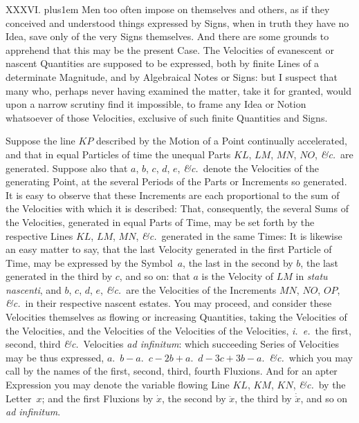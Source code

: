 \medbreak

XXXVI. \hskip 0pt plus1em
Men too often impose on themselves and others, as if they
conceived and understood things expressed by Signs, when in truth
they have no Idea, save only of the very Signs themselves.  And
there are some grounds to apprehend that this may be the present
Case.  The Velocities of evanescent or nascent Quantities are
supposed to be expressed, both by finite Lines of a determinate
Magnitude, and by Algebraical Notes or Signs: but I suspect that
many who, perhaps never having examined the matter, take it for
granted, would upon a narrow scrutiny find it impossible, to
frame any Idea or Notion whatsoever of those Velocities,
exclusive of such finite Quantities and Signs.

\midinsert
\centerline{}
\endinsert

\noindent
Suppose the line
$KP$ described by the Motion of a Point continually accelerated,
and that in equal Particles of time the unequal Parts $KL$, $LM$,
$MN$, $NO$, {\it \&c.}\ are generated.  Suppose also that $a$,
$b$, $c$, $d$, $e$, {\it \&c.}\ denote the Velocities of the
generating Point, at the several Periods of the Parts or
Increments so generated.  It is easy to observe that these
Increments are each proportional to the sum of the Velocities
with which it is described: That, consequently, the several Sums
of the Velocities, generated in equal Parts of Time, may be set
forth by the respective Lines $KL$, $LM$, $MN$,
{\it \&c.}\ generated in the same Times: It is likewise an easy
matter to say, that the last Velocity generated in the first
Particle of Time, may be expressed by the Symbol~$a$, the last in
the second by $b$, the last generated in the third by $c$, and so
on: that $a$ is the Velocity of $LM$ in {\it statu nascenti}, and
$b$, $c$, $d$, $e$, {\it \&c.}\ are the Velocities of the
Increments $MN$, $NO$, $OP$, {\it \&c.}\ in their respective
nascent estates.  You may proceed, and consider these Velocities
themselves as flowing or increasing Quantities, taking the
Velocities of the Velocities, and the Velocities of the
Velocities of the Velocities, {\it i.~e.}\ the first, second,
third {\it \&c.}\ Velocities {\it ad infinitum\/}: which
succeeding Series of Velocities may be thus expressed,
$a$.\ $b - a$.\ $c - 2b + a$.\ $d - 3c + 3b - a$.\ {\it \&c.}\
which you may call by the names of the first, second, third,
fourth Fluxions.  And for an apter Expression you may denote the
variable flowing Line $KL$, $KM$, $KN$, {\it \&c.}\ by the
Letter~$x$; and the first Fluxions by $\dot{x}$, the second by
$\ddot{x}$, the third by $\dot{\ddot{x}}$, and so on {\it ad
infinitum}.

